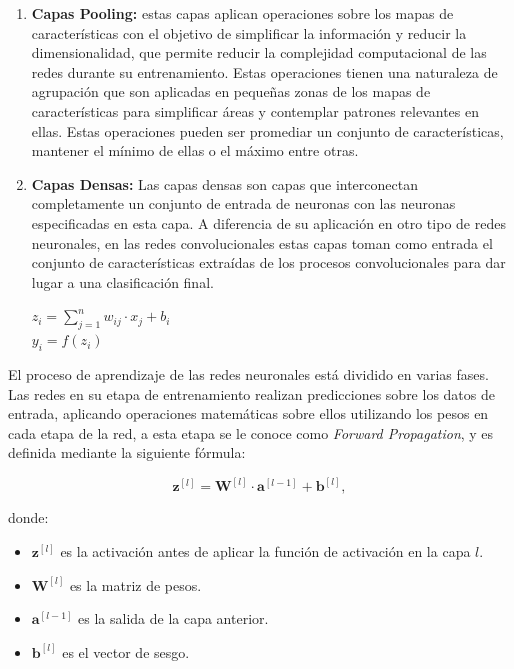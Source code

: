 \begin{enumerate}
	\item \textbf{Capas Pooling:} estas capas aplican operaciones sobre los mapas de características con el objetivo de simplificar la información y reducir la dimensionalidad, que permite reducir la complejidad computacional de las redes durante su entrenamiento. Estas operaciones tienen una naturaleza de agrupación que son aplicadas en pequeñas zonas de los mapas de características para simplificar áreas y contemplar patrones relevantes en ellas. Estas operaciones pueden ser promediar un conjunto de características, mantener el mínimo de ellas o el máximo entre otras.
	
	\item \textbf{Capas Densas:} Las capas densas son capas que interconectan completamente un conjunto de entrada de neuronas con las neuronas especificadas en esta capa. A diferencia de su aplicación en otro tipo de redes neuronales, en las redes convolucionales estas capas toman como entrada el conjunto de características extraídas de los procesos convolucionales para dar lugar a una clasificación final.
	\begin{center}
		$z_i = \sum_{j=1}^{n} w_{ij} \cdot x_j + b_i$\\
		$y_i = f(z_i)$
	\end{center}
\end{enumerate}


El proceso de aprendizaje de las redes neuronales está dividido en varias fases. Las redes en su etapa de entrenamiento realizan predicciones sobre los datos de entrada, aplicando operaciones matemáticas sobre ellos utilizando los pesos en cada etapa de la red, a esta etapa se le conoce como \textit{Forward Propagation}, y es definida mediante la siguiente fórmula:


\[
\mathbf{z}^{[l]} = \mathbf{W}^{[l]} \cdot \mathbf{a}^{[l-1]} + \mathbf{b}^{[l]},
\]

donde:
\begin{itemize}
	\item \(\mathbf{z}^{[l]}\) es la activación antes de aplicar la función de activación en la capa \(l\).
	\item \(\mathbf{W}^{[l]}\) es la matriz de pesos.
	\item \(\mathbf{a}^{[l-1]}\) es la salida de la capa anterior.
	\item \(\mathbf{b}^{[l]}\) es el vector de sesgo.
\end{itemize}

